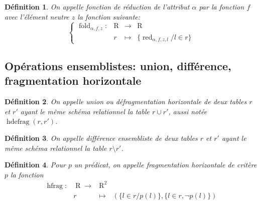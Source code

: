 \documentclass[french]{article}
\DeclareMathOperator{\R}{R}
\DeclareMathOperator{\redu}{red}
\DeclareMathOperator{\hfrag}{hfrag}
\DeclareMathOperator{\hdefrag}{hdefrag}
\newcommand{\fold}[3]{\operatorname{fold}_{#1, #2, #3}}
\newcommand{\foldAlphafz}{\fold{\alpha}{f}{z}}
\newtheorem{defi}{Définition}
\begin{document}
\begin{defi}
	On appelle \emph{fonction de réduction de l'attribut $\alpha$
		par la fonction $f$ avec l'élément neutre $z$} la fonction suivante:
	$$
	\left\lbrace
	\begin{array}{llcl}
	\foldAlphafz : & \R & \rightarrow & \R \\
				& r 	& \mapsto & \{ \redu_{\alpha, f, z, l} / l\in r \}
	\end{array}
	\right.
	$$
\end{defi}

\subsection*{Opérations ensemblistes: union, différence, fragmentation horizontale}
\begin{defi}
	On appelle \emph{union} ou \emph{défragmentation horizontale}
	de deux tables $r$ et $r'$ ayant le même schéma relationnel
	la table $r \cup r'$, aussi notée $\hdefrag(r, r')$.
\end{defi}

\begin{defi}
	On appelle \emph{différence ensembliste}
	de deux tables $r$ et $r'$ ayant le même schéma relationnel
	la table $r \setminus r'$.
\end{defi}

\begin{defi}
	Pour $p$ un prédicat, on appelle \emph{fragmentation horizontale 
		de critère $p$}
	la fonction
	$$
	\begin{array}{llcl}
	\hfrag : & \R \rightarrow & \R^2 \\
			& r & \mapsto & (\{l \in r / p(l)\} , \{l \in r, \neg p(l)\})
	\end{array}
	$$
\end{defi}
\end{document}
